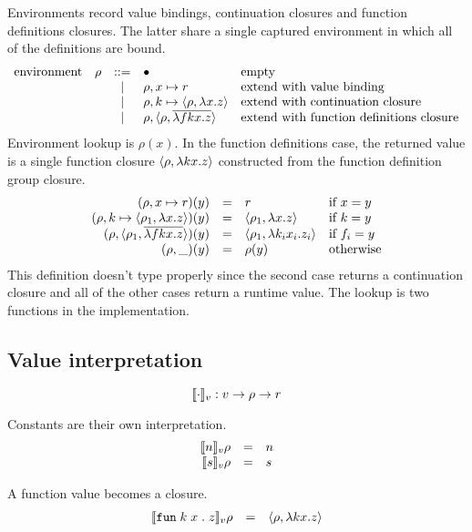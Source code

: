 \documentclass[11pt]{article}
\begin{document}
Environments record value bindings, continuation closures and function definitions  closures.
The latter share a single captured environment in which all of the definitions are bound.
\[
\begin{array}{rlcll}
\text{environment}
  & \rho & ::= & \bullet                       & \text{empty} \\
  &      & |   & \extv{\rho}{x}{r}             & \text{extend with value binding} \\
  &      & |   & \extc{\rho}{k}{\rho}{x}{z}    & \text{extend with continuation closure} \\
  &      & |   & \extf{\rho}{\rho}{f}{k}{x}{z} & \text{extend with function definitions closure}
\end{array}
\]
Environment lookup is $\rho(x)$.
In the function definitions case, the returned value is a single function closure $\clsf{\rho}{k}{x}{z}$ constructed from the function definition group closure.
\[
\begin{array}{rlll}
(\extv{\rho}{x}{r})(y) & = &
  r &
  \text{if $x = y$} \\
(\extc{\rho}{k}{\rho_1}{x}{z})(y) & = &
  \clsc{\rho_1}{x}{z} &
  \text{if $k = y$} \\
(\extf{\rho}{\rho_1}{f}{k}{x}{z})(y) & = &
  \clsf{\rho_1}{k_i}{x_i}{z_i} &
  \text{if $f_i = y$} \\
(\rho, \_)(y) & = &
  \rho(y) &
  \text{otherwise}
\end{array}
\]
This definition doesn't type properly since the second case returns a continuation closure and all of the other cases return a runtime value.
The lookup is two functions in the implementation.

\subsection*{Value interpretation}

\[
    \cmpn{v} : v -> \rho -> r
\]

Constants are their own interpretation.
\[
\begin{array}{rlll}
\cmp{v}{\intv{n}}{\rho} & = & n \\
\cmp{v}{\strv{s}}{\rho} & = & s \\
\end{array}
\]

A function value becomes a closure.
\[
\begin{array}{rlll}
\cmp{v}{\funv{k}{x}{z}}{\rho} & = & \clsf{\rho}{k}{x}{z} \\
\end{array}
\]
\end{document}

